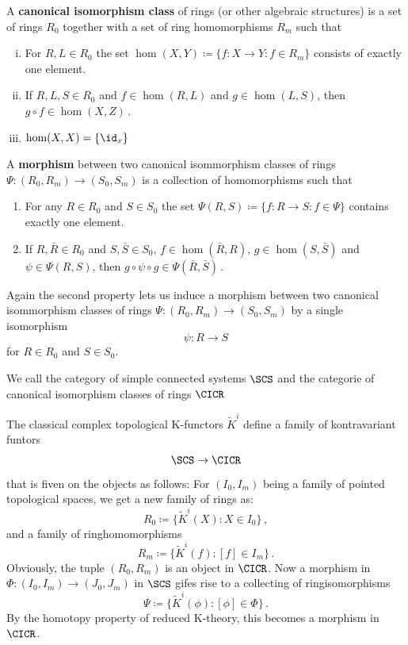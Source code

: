 \begin{definition}
	A \textbf{canonical isomorphism class } of rings (or other algebraic structures) is a set of rings $R_0$ together with a set of ring homomorphisms $R_m$ such that
	\begin{enumerate}[(i)]
		\item For $R,L \in R_0$ the set $\hom(X,Y)\coloneq \{f:X\to Y: f \in R_m\}$ consists of exactly one element. 
		\item If $R,L,S\in R_0$ and $f\in \hom(R,L)$ and $g\in \hom(L,S)$, then $g\circ f\in \hom(X,Z)\,$.
		\item $\hom(X,X)=\{\id_x\}$
	\end{enumerate}
	A \textbf{morphism} between two canonical isommorphism classes of rings $\Psi: (R_0,R_m)\to (S_0,S_m)$ is a collection of homomorphisms such that 
	\begin{enumerate}
		\item For any $R\in R_0$ and $S\in S_0$ the set $\Psi(R,S)\coloneq \{f:R\to S: f\in \Psi\}$ contains exactly one element.
		\item If $R,\bar{R}\in R_0$ and $S,\bar{S}\in S_0$, $f\in \hom(\bar{R},R)$, $g\in \hom(S,\bar{S})$ and $\psi\in \Psi(R,S)$, then $g\circ \psi\circ g\in \Psi(\bar{R},\bar{S})\,$.
	\end{enumerate}
\end{definition}
\begin{remark}
	Again the second property lets us induce a morphism between two canonical isommorphism classes of rings $\Psi: (R_0,R_m)\to (S_0,S_m)$ by a single isomorphism 
	\begin{equation*}
		\psi: R\to S
	\end{equation*} for $R\in R_0$ and $S\in S_0$.
\end{remark}
\begin{remark}
	We call the category of simple connected systems $\SCS$ and the categorie of canonical isomorphism classes of rings $\CICR$ 
\end{remark}
\begin{definition}
	The classical complex topological K-functors $\tilde{K}^i$ define a family of kontravariant funtors 
	\begin{align*}
		\SCS \to \CICR
	\end{align*} that is fiven on the objects as follows:
	For $(I_0,I_m)$ being a family of pointed topological spaces, we get a new family of rings as:
	\begin{equation*}
		R_0\coloneq \{\tilde{K}^i(X): X\in I_0\}\,,
	\end{equation*} and a family of ringhomomorphisms 
	\begin{equation*}
		R_m \coloneq \{\tilde{K}^i(f):[f]\in I_m\}\,.
	\end{equation*}Obviously, the tuple $(R_0,R_m)$ is an object in $\CICR$. 
	Now a morphism in $\Phi:(I_0,I_m)\to (J_0,J_m)$ in $\SCS$ gifes rise to a collecting of ringisomorphisms
	\begin{equation*}
		\Psi\coloneq \{\tilde{K}^i(\phi):[\phi]\in \Phi\}\,.
	\end{equation*}By the homotopy property of reduced K-theory, this becomes a morphism in $\CICR$.
\end{definition}
